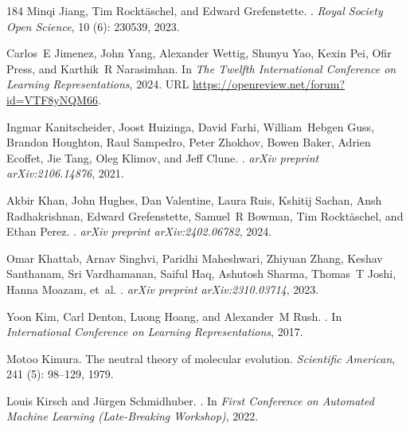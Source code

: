 \begin{thebibliography}{184}
Minqi Jiang, Tim Rockt{\"a}schel, and Edward Grefenstette.
.
\newblock \emph{Royal Society Open Science}, 10 (6): 230539,
  2023.

Carlos~E Jimenez, John Yang, Alexander Wettig, Shunyu Yao, Kexin Pei, Ofir
  Press, and Karthik~R Narasimhan.
\newblock In \emph{The Twelfth International Conference on Learning
  Representations}, 2024.
\newblock URL \url{https://openreview.net/forum?id=VTF8yNQM66}.

Ingmar Kanitscheider, Joost Huizinga, David Farhi, William~Hebgen Guss, Brandon
  Houghton, Raul Sampedro, Peter Zhokhov, Bowen Baker, Adrien Ecoffet, Jie
  Tang, Oleg Klimov, and Jeff Clune.
.
\newblock \emph{arXiv preprint arXiv:2106.14876}, 2021.

Akbir Khan, John Hughes, Dan Valentine, Laura Ruis, Kshitij Sachan, Ansh
  Radhakrishnan, Edward Grefenstette, Samuel~R Bowman, Tim Rockt{\"a}schel, and
  Ethan Perez.
.
\newblock \emph{arXiv preprint arXiv:2402.06782}, 2024.

Omar Khattab, Arnav Singhvi, Paridhi Maheshwari, Zhiyuan Zhang, Keshav
  Santhanam, Sri Vardhamanan, Saiful Haq, Ashutosh Sharma, Thomas~T Joshi,
  Hanna Moazam, et~al.
.
\newblock \emph{arXiv preprint arXiv:2310.03714}, 2023.

Yoon Kim, Carl Denton, Luong Hoang, and Alexander~M Rush.
.
\newblock In \emph{International Conference on Learning Representations}, 2017.

Motoo Kimura.
\newblock The neutral theory of molecular evolution.
\newblock \emph{Scientific American}, 241 (5): 98--129, 1979.

Louis Kirsch and J{\"u}rgen Schmidhuber.
.
\newblock In \emph{First Conference on Automated Machine Learning
  (Late-Breaking Workshop)}, 2022.


\end{thebibliography}
